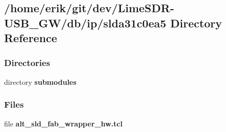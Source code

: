 \subsection{/home/erik/git/dev/\+Lime\+S\+D\+R-\/\+U\+S\+B\+\_\+\+G\+W/db/ip/slda31c0ea5 Directory Reference}
\label{dir_abb771075a4194e536f6ee7c8148033e}
\subsubsection*{Directories}
\begin{DoxyCompactItemize}
\item 
directory {\bf submodules}
\end{DoxyCompactItemize}
\subsubsection*{Files}
\begin{DoxyCompactItemize}
\item 
file {\bf alt\+\_\+sld\+\_\+fab\+\_\+wrapper\+\_\+hw.\+tcl}
\end{DoxyCompactItemize}
